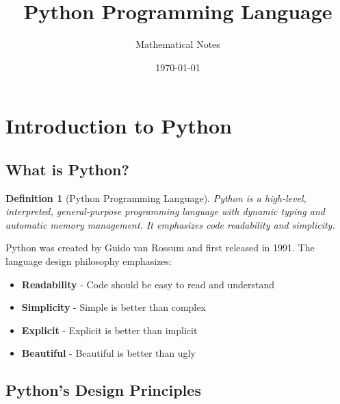\documentclass[11pt]{article}
\title{Python Programming Language}
\author{Mathematical Notes}
\date{\today}
\newtheorem{definition}{Definition}[section]
\begin{document}
\maketitle
\tableofcontents
\newpage

\section{Introduction to Python}

\subsection{What is Python?}

\begin{definition}[Python Programming Language]
Python is a high-level, interpreted, general-purpose programming language with dynamic typing and automatic memory management. It emphasizes code readability and simplicity.
\end{definition}

Python was created by Guido van Rossum and first released in 1991. The language design philosophy emphasizes:
\begin{itemize}
    \item \textbf{Readability} - Code should be easy to read and understand
    \item \textbf{Simplicity} - Simple is better than complex
    \item \textbf{Explicit} - Explicit is better than implicit
    \item \textbf{Beautiful} - Beautiful is better than ugly
\end{itemize}

\subsection{Python's Design Principles}
\end{document}
